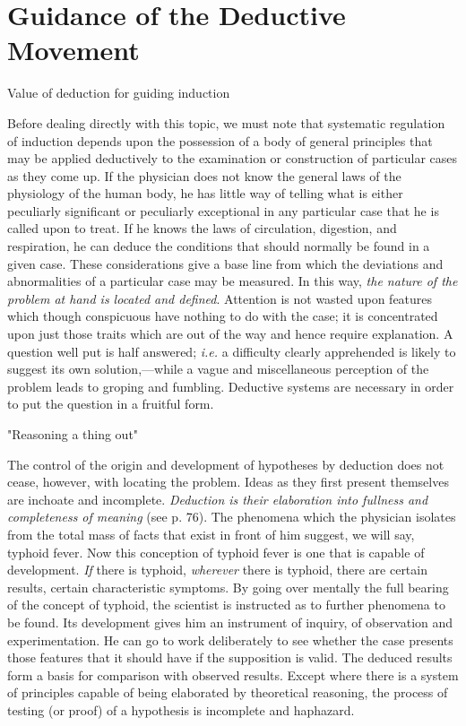 \documentclass[letterpaper]{book}
\begin{document}
\section{Guidance of the Deductive Movement}

Value of deduction for guiding induction

Before dealing directly with this topic, we must note that systematic
regulation of induction depends upon the possession of a body of general
principles that may be applied deductively to the examination or
construction of particular cases as they come up. If the physician does
not know the general laws of the physiology of the human body, he has
little way of telling what is either peculiarly significant or
peculiarly
exceptional in any particular case that he is called upon to treat. If
he knows the laws of circulation, digestion, and respiration, he can
deduce the conditions that should normally be found in a given case.
These considerations give a base line from which the deviations and
abnormalities of a particular case may be measured. In this way,
\emph{the nature of the problem at hand is located and defined}.
Attention is not wasted upon features which though conspicuous have
nothing to do with the case; it is concentrated upon just those traits
which are out of the way and hence require explanation. A question well
put is half answered; \emph{i.e.} a difficulty clearly apprehended is
likely to suggest its own solution,---while a vague and miscellaneous
perception of the problem leads to groping and fumbling. Deductive
systems are necessary in order to put the question in a fruitful form.

"Reasoning a thing out"

The control of the origin and development of hypotheses by deduction
does not cease, however, with locating the problem. Ideas as they first
present themselves are inchoate and incomplete. \emph{Deduction is their
elaboration into fullness and completeness of meaning} (see p. 76). The
phenomena which the physician isolates from the total mass of facts that
exist in front of him suggest, we will say, typhoid fever. Now this
conception of typhoid fever is one that is capable of development.
\emph{If} there is typhoid, \emph{wherever} there is typhoid, there are
certain results, certain characteristic symptoms. By going over mentally
the full bearing of the concept of typhoid, the scientist is instructed
as to further phenomena to be found. Its development gives him an
instrument of inquiry, of observation and experimentation. He can go to
work deliberately to see
whether
the case presents those features that it should have if the supposition
is valid. The deduced results form a basis for comparison with observed
results. Except where there is a system of principles capable of being
elaborated by theoretical reasoning, the process of testing (or proof)
of a hypothesis is incomplete and haphazard.
\end{document}

